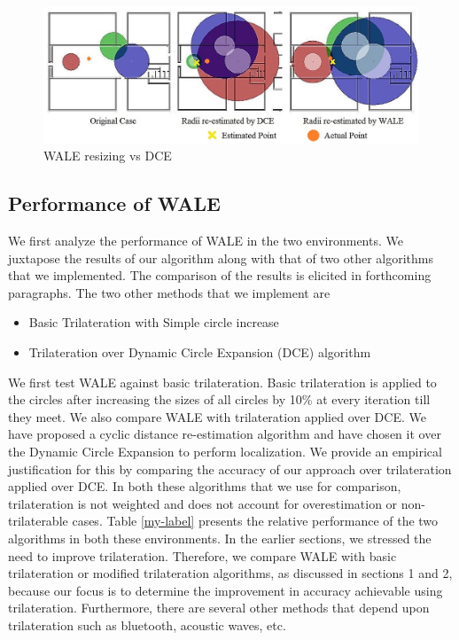 \documentclass[twocolumn]{svjour3}
\begin{document}
\begin{figure}[!ht]
\centering
\includegraphics[width=125mm]{comparisoncase.jpg}
\centering\caption{WALE resizing vs DCE}
\label{re-est}
\end{figure}

\subsection{\textbf{Performance of WALE}}
We first analyze the performance of WALE in the two environments. We juxtapose the results of our algorithm along with that of two other algorithms that we implemented. The comparison of the results is elicited in forthcoming paragraphs.
The two other methods that we implement are
\begin{itemize}
    \item Basic Trilateration with Simple circle increase
    \item Trilateration over Dynamic Circle Expansion (DCE) algorithm
\end{itemize}

We first test WALE against basic trilateration. Basic trilateration is applied to the circles after increasing the sizes of all circles by 10\% at every iteration till they meet. We also compare WALE with trilateration applied over DCE. 
We have proposed a cyclic distance re-estimation algorithm and have chosen it over the Dynamic Circle Expansion \citep*{DCE} to perform localization. We provide an empirical justification for this by comparing the accuracy of our approach over trilateration applied over DCE. 
In both these algorithms that we use for comparison, trilateration is not weighted and does not account for overestimation or non-trilaterable cases. Table \ref{my-label} presents the relative performance of the two algorithms in both these environments. 
In the earlier sections, we stressed the need to improve trilateration. Therefore, we compare WALE with basic trilateration or modified trilateration algorithms, as discussed in sections 1 and 2, because our focus is to determine the improvement in accuracy achievable using trilateration. Furthermore, there are several other methods that depend upon trilateration such as bluetooth, acoustic waves, etc.
\end{document}
